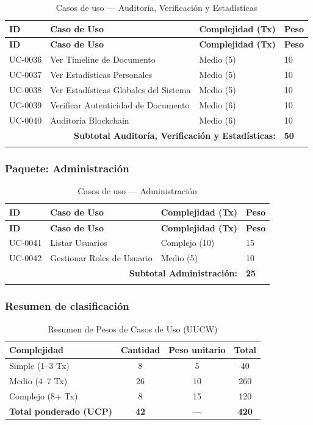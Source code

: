\documentclass[11pt, a4paper]{article}
\begin{document}
\begin{longtable}{|p{1.8cm}|p{6.5cm}|p{3cm}|p{1.5cm}|}
\hline
\textbf{ID} & \textbf{Caso de Uso} & \textbf{Complejidad (Tx)} & \textbf{Peso} \\
\hline
\endfirsthead
\hline
\textbf{ID} & \textbf{Caso de Uso} & \textbf{Complejidad (Tx)} & \textbf{Peso} \\
\hline
\endhead
UC-0036 & Ver Timeline de Documento & Medio (5) & 10 \\
\hline
UC-0037 & Ver Estadísticas Personales & Medio (5) & 10 \\
\hline
UC-0038 & Ver Estadísticas Globales del Sistema & Medio (5) & 10 \\
\hline
UC-0039 & Verificar Autenticidad de Documento & Medio (6) & 10 \\
\hline
UC-0040 & Auditoría Blockchain & Medio (6) & 10 \\
\hline
\multicolumn{3}{|r|}{\textbf{Subtotal Auditoría, Verificación y Estadísticas:}} & \textbf{50} \\
\hline
\caption{Casos de uso --- Auditoría, Verificación y Estadísticas}
\end{longtable}

\subsubsection*{Paquete: Administración}

\begin{longtable}{|p{1.8cm}|p{6.5cm}|p{3cm}|p{1.5cm}|}
\hline
\textbf{ID} & \textbf{Caso de Uso} & \textbf{Complejidad (Tx)} & \textbf{Peso} \\
\hline
\endfirsthead
\hline
\textbf{ID} & \textbf{Caso de Uso} & \textbf{Complejidad (Tx)} & \textbf{Peso} \\
\hline
\endhead
UC-0041 & Listar Usuarios & Complejo (10) & 15 \\
\hline
UC-0042 & Gestionar Roles de Usuario & Medio (5) & 10 \\
\hline
\multicolumn{3}{|r|}{\textbf{Subtotal Administración:}} & \textbf{25} \\
\hline
\caption{Casos de uso --- Administración}
\end{longtable}

\subsubsection*{Resumen de clasificación}

\begin{table}[H]
\centering
\begin{tabular}{|l|c|c|c|}
\hline
\textbf{Complejidad} & \textbf{Cantidad} & \textbf{Peso unitario} & \textbf{Total} \\
\hline
Simple (1--3 Tx) & 8 & 5 & 40 \\
\hline
Medio (4--7 Tx) & 26 & 10 & 260 \\
\hline
Complejo (8+ Tx) & 8 & 15 & 120 \\
\hline
\textbf{Total ponderado (UCP)} & \textbf{42} & --- & \textbf{420} \\
\hline
\end{tabular}
\caption{Resumen de Pesos de Casos de Uso (UUCW)}
\end{table}
\end{document}
